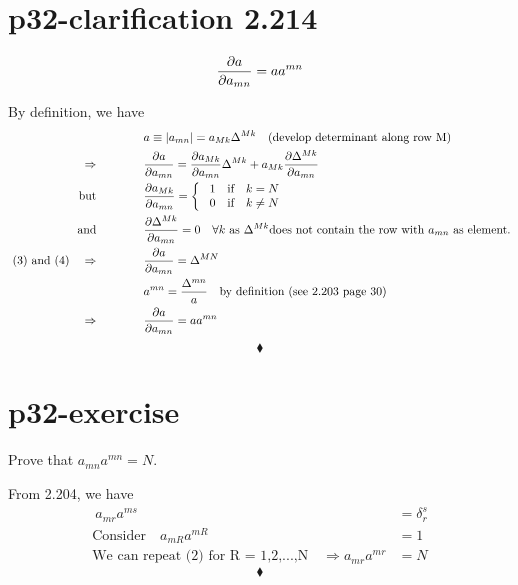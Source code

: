 \section{p32-clarification 2.214}
\begin{tcolorbox}
          $$ \pdv{a}{a_{mn}} = a a^{mn}$$
\end{tcolorbox}
By definition, we have
\begin{align}
\  &a\equiv |a_{mn}| = a_{Mk}\Delta^{Mk}\quad\text{(develop determinant along row M)}\\
\ \Rightarrow \quad\quad\quad\quad &\pdv{a}{a_{mn}} = \pdv{a_{Mk}}{a_{mn}}\Delta^{Mk} + a_{Mk}\pdv{\Delta^{Mk}}{a_{mn}}\\
\text{but}\quad\quad\quad\quad  &\pdv{a_{Mk}}{a_{mn}} = \left\{\begin{array}{c}
\ 1\quad\text{if} \quad k = N\\
\ 0\quad\text{if} \quad k \neq N\\
\end{array}\right.\\
\text{and}\quad\quad\quad\quad  &\pdv{\Delta^{Mk}}{a_{mn}} = 0 \quad \forall k \text{ as } \Delta^{Mk} \text{does not contain the row with } a_{mn} \text{ as element.}\\
\  \text{(3) and (4)}\quad  \Rightarrow \quad\quad\quad\quad & \pdv{a}{a_{mn}} = \Delta^{MN}\\ 
\ &  a^{mn} = \frac{\Delta^{mn}}{a}\quad\text{by definition (see 2.203 page 30)}\\
\  \Rightarrow \quad\quad\quad\quad  &\pdv{a}{a_{mn}} = aa^{mn}
\end{align} 
$$\blacklozenge$$
\newpage


\section{p32-exercise}
\begin{tcolorbox}
Prove that $a_{mn}a^{mn} = N$.
\end{tcolorbox}
From 2.204, we have
\begin{align}
\ a_{mr}a^{ms} &= \delta^s_r\\
\text{Consider} \quad a_{mR}a^{mR} &= 1\\
\text{We can repeat (2) for R = 1,2,...,N} \quad \Rightarrow a_{mr}a^{mr} &= N
\end{align}
$$\blacklozenge$$
\newpage


